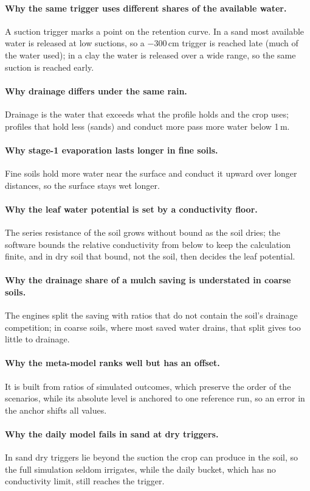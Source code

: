 \paragraph{Why the same trigger uses different shares of the available water.} A suction trigger marks a point on the retention curve. In a sand most available water is released at low suctions, so a $-300$\,cm trigger is reached late (much of the water used); in a clay the water is released over a wide range, so the same suction is reached early.
\paragraph{Why drainage differs under the same rain.} Drainage is the water that exceeds what the profile holds and the crop uses; profiles that hold less (sands) and conduct more pass more water below 1\,m.
\paragraph{Why stage-1 evaporation lasts longer in fine soils.} Fine soils hold more water near the surface and conduct it upward over longer distances, so the surface stays wet longer.
\paragraph{Why the leaf water potential is set by a conductivity floor.} The series resistance of the soil grows without bound as the soil dries; the software bounds the relative conductivity from below to keep the calculation finite, and in dry soil that bound, not the soil, then decides the leaf potential.
\paragraph{Why the drainage share of a mulch saving is understated in coarse soils.} The engines split the saving with ratios that do not contain the soil's drainage competition; in coarse soils, where most saved water drains, that split gives too little to drainage.
\paragraph{Why the meta-model ranks well but has an offset.} It is built from ratios of simulated outcomes, which preserve the order of the scenarios, while its absolute level is anchored to one reference run, so an error in the anchor shifts all values.
\paragraph{Why the daily model fails in sand at dry triggers.} In sand dry triggers lie beyond the suction the crop can produce in the soil, so the full simulation seldom irrigates, while the daily bucket, which has no conductivity limit, still reaches the trigger.

